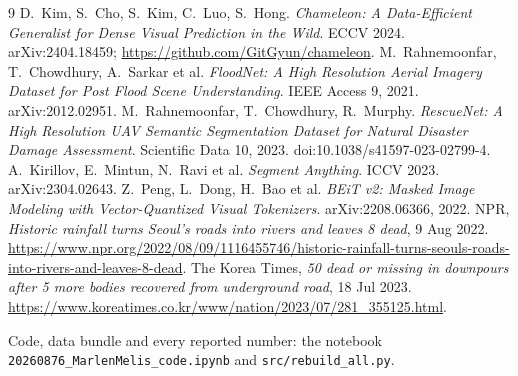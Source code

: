 \documentclass[10pt]{article}
\begin{document}
\renewcommand{\refname}{\large References}
\begingroup\small
\begin{thebibliography}{9}\setlength{\itemsep}{0pt}
 D.~Kim, S.~Cho, S.~Kim, C.~Luo, S.~Hong. \emph{Chameleon: A Data-Efficient Generalist for Dense Visual Prediction in the Wild}. ECCV 2024. arXiv:2404.18459; \url{https://github.com/GitGyun/chameleon}.
 M.~Rahnemoonfar, T.~Chowdhury, A.~Sarkar et al. \emph{FloodNet: A High Resolution Aerial Imagery Dataset for Post Flood Scene Understanding}. IEEE Access 9, 2021. arXiv:2012.02951.
 M.~Rahnemoonfar, T.~Chowdhury, R.~Murphy. \emph{RescueNet: A High Resolution UAV Semantic Segmentation Dataset for Natural Disaster Damage Assessment}. Scientific Data 10, 2023. doi:10.1038/s41597-023-02799-4.
 A.~Kirillov, E.~Mintun, N.~Ravi et al. \emph{Segment Anything}. ICCV 2023. arXiv:2304.02643.
 Z.~Peng, L.~Dong, H.~Bao et al. \emph{BEiT v2: Masked Image Modeling with Vector-Quantized Visual Tokenizers}. arXiv:2208.06366, 2022.
 NPR, \emph{Historic rainfall turns Seoul's roads into rivers and leaves 8 dead}, 9 Aug 2022. \url{https://www.npr.org/2022/08/09/1116455746/historic-rainfall-turns-seouls-roads-into-rivers-and-leaves-8-dead}.
 The Korea Times, \emph{50 dead or missing in downpours after 5 more bodies recovered from underground road}, 18 Jul 2023. \url{https://www.koreatimes.co.kr/www/nation/2023/07/281_355125.html}.
\end{thebibliography}
\par Code, data bundle and every reported number: the notebook \texttt{20260876\_MarlenMelis\_code.ipynb} and \texttt{src/rebuild\_all.py}.
\endgroup
\end{document}
